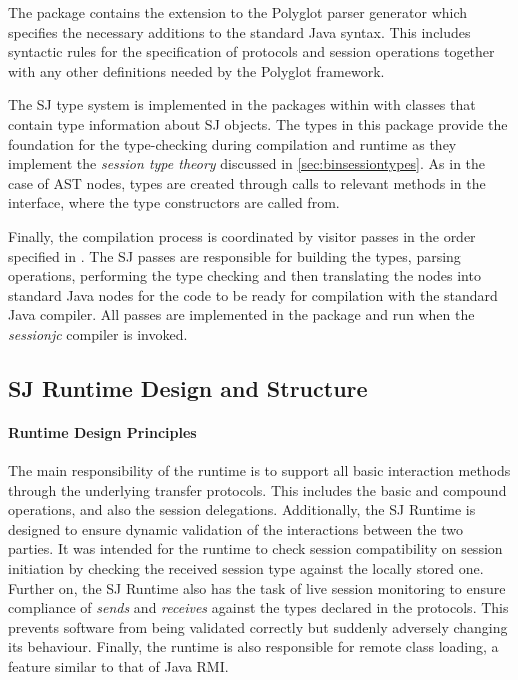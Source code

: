 The package  contains the extension to the Polyglot parser generator which specifies the necessary additions to the standard Java syntax. This includes syntactic rules for the specification of protocols and session operations together with any other definitions needed by the Polyglot framework.

The SJ type system is implemented in the packages within  with classes that contain type information about SJ objects. The types in this package provide the foundation for the type-checking during compilation and runtime as they implement the \textit{session type theory} discussed in \autoref{sec:binsessiontypes}. As in the case of AST nodes, types are created through calls to relevant methods in the  interface, where the type constructors are called from.

Finally, the compilation process is coordinated by visitor passes in the order specified in . The SJ passes are responsible for building the types, parsing operations, performing the type checking and then translating the nodes into standard Java nodes for the code to be ready for compilation with the standard Java compiler. All passes are implemented in the  package and run when the \textit{sessionjc} compiler is invoked.


\subsection{SJ Runtime Design and Structure}
\label{subsec:sjrun}

\paragraph*{Runtime Design Principles}
The main responsibility of the runtime is to support all basic interaction methods through the underlying transfer protocols. This includes the basic and compound operations, and also the session delegations. Additionally, the SJ Runtime is designed to ensure dynamic validation of the interactions between the two parties. It was intended for the runtime to check session compatibility on session initiation by checking the received session type against the locally stored one. Further on, the SJ Runtime also has the task of live session monitoring to ensure compliance of \textit{sends} and \textit{receives} against the types declared in the protocols. This prevents software from being validated correctly but suddenly adversely changing its behaviour. Finally, the runtime is also responsible for remote class loading, a feature similar to that of Java RMI. 

